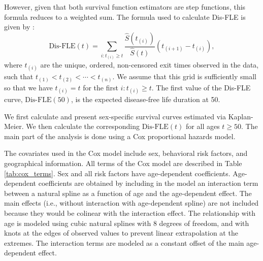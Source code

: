\documentclass{article}
\begin{document}
However, given that both survival function estimators are step
functions, this formula reduces to a weighted sum. The formula used to
calculate Dis-FLE is given by : \[
\text{Dis-FLE}(t) =
  \sum_{i : t_{(i)} \geq t} \frac{\hat{S}(t_{(i)})}{\hat{S}(t)}(t_{(i+1)} - t_{(i)}),
\] where \(t_{(i)}\) are the unique, ordered, non-censored exit times
observed in the data, such that
\(t_{(1)} < t_{(2)} < \cdots < t_{(n)}\). We assume that this grid is
sufficiently small so that we have \(t_{(i)} = t\) for the first
\(i : t_{(i)} \geq t\). The first value of the Dis-FLE curve,
\(\text{Dis-FLE}(50)\), is the expected disease-free life duration at
50.

We first calculate and present sex-specific survival curves estimated
via Kaplan-Meier. We then calculate the corresponding
\(\text{Dis-FLE}(t)\) for all ages \(t \geq 50\). The main part of the
analysis is done using a Cox proportional hazards model.

The covariates used in the Cox model include sex, behavioral risk
factors, and geographical information. All terms of the Cox model are
described in Table \ref{tab:cox_terms}. Sex and all risk factors have
age-dependent coefficients. Age-dependent coefficients are obtained by
including in the model an interaction term between a natural spline as a
function of age and the age-dependent effect. The main effects (i.e.,
without interaction with age-dependent spline) are not included because
they would be colinear with the interaction effect. The relationship
with age is modeled using cubic natural splines with 8 degrees of
freedom, and with knots at the edges of observed values to prevent
linear extrapolation at the extremes. The interaction terms are modeled
as a constant offset of the main age-dependent effect.
\end{document}
